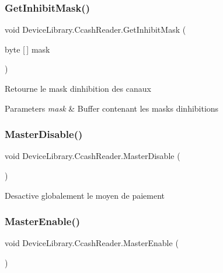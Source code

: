 \subsubsection{\texorpdfstring{Get\+Inhibit\+Mask()}{GetInhibitMask()}}
{\footnotesize\ttfamily void Device\+Library.\+Ccash\+Reader.\+Get\+Inhibit\+Mask (\begin{DoxyParamCaption}\item[{byte \mbox{[}$\,$\mbox{]}}]{mask }\end{DoxyParamCaption})\hspace{0.3cm}{\ttfamily [inline]}}



Retourne le mask d\textquotesingle{}inhibition des canaux 


\begin{DoxyParams}{Parameters}
{\em mask} & Buffer contenant les masks d\textquotesingle{}inhibitions\\
\hline
\end{DoxyParams}
\mbox{\label{class_device_library_1_1_ccash_reader_acd4d9cf6f8ee0299f5521b6ff6fabc57}} 
\subsubsection{\texorpdfstring{Master\+Disable()}{MasterDisable()}}
{\footnotesize\ttfamily void Device\+Library.\+Ccash\+Reader.\+Master\+Disable (\begin{DoxyParamCaption}{ }\end{DoxyParamCaption})\hspace{0.3cm}{\ttfamily [inline]}}



Desactive globalement le moyen de paiement 

\mbox{\label{class_device_library_1_1_ccash_reader_aec351cc4aeaf3fd814808de16bbc97f7}} 
\subsubsection{\texorpdfstring{Master\+Enable()}{MasterEnable()}}
{\footnotesize\ttfamily void Device\+Library.\+Ccash\+Reader.\+Master\+Enable (\begin{DoxyParamCaption}{ }\end{DoxyParamCaption})\hspace{0.3cm}{\ttfamily [inline]}}




